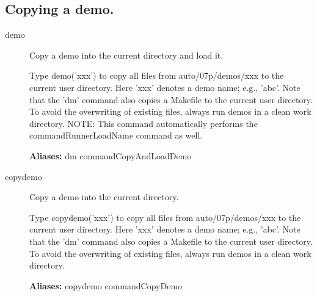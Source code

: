 \documentclass[12pt]{report}
\begin{document}
\subsection{Copying a demo.}
\label{sec:clui_ref_demo}
\begin{description}
\item[demo]
Copy a demo into the current directory and load it.

    Type demo('xxx') to copy all files from auto/07p/demos/xxx to the
    current user directory.  Here 'xxx' denotes a demo name; e.g.,
    'abc'.  Note that the 'dm' command also copies a Makefile to the
    current user directory. To avoid the overwriting of existing
    files, always run demos in a clean work directory.  NOTE: This
    command automatically performs the commandRunnerLoadName command
    as well.
    
\textbf{Aliases:} dm commandCopyAndLoadDemo

\item[copydemo]
Copy a demo into the current directory.

    Type copydemo('xxx') to copy all files from auto/07p/demos/xxx to the
    current user directory.  Here 'xxx' denotes a demo name; e.g.,
    'abc'.  Note that the 'dm' command also copies a Makefile to the
    current user directory. To avoid the overwriting of existing
    files, always run demos in a clean work directory.
    
\textbf{Aliases:} copydemo commandCopyDemo
\end{description}
\end{document}
